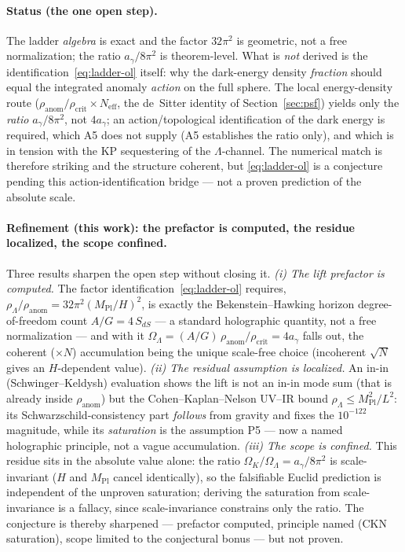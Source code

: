 \documentclass[11pt,a4paper]{article}
\theoremstyle{plain}
\theoremstyle{definition}
\theoremstyle{remark}
\newcommand{\Ok}{\Omega_K}
\newcommand{\OL}{\Omega_\Lambda}
\newcommand{\ag}{a_\gamma}
\newcommand{\Mpl}{M_{\mathrm{Pl}}}
\begin{document}
\paragraph{Status (the one open step).} The ladder \emph{algebra} is exact and the factor
$32\pi^2$ is geometric, not a free normalization; the ratio $\ag/8\pi^2$ is theorem-level. What
is \emph{not} derived is the identification~\eqref{eq:ladder-ol} itself: why the dark-energy
density \emph{fraction} should equal the integrated anomaly \emph{action} on the full sphere. The
local energy-density route ($\rho_{\mathrm{anom}}/\rho_{\mathrm{crit}}\times N_{\mathrm{eff}}$, the
de~Sitter identity of Section~\ref{sec:psf}) yields only the \emph{ratio} $\ag/8\pi^2$, not
$4\ag$; an action/topological identification of the dark energy is required, which A5 does not
supply (A5 establishes the ratio only), and which is in tension with the KP sequestering of the
$\Lambda$-channel. The numerical match is therefore striking and the structure coherent, but
\eqref{eq:ladder-ol} is a conjecture pending this action-identification bridge --- not a proven
prediction of the absolute scale.

\paragraph{Refinement (this work): the prefactor is computed, the residue localized, the scope confined.}
Three results sharpen the open step without closing it. \emph{(i) The lift prefactor is computed.}
The factor identification~\eqref{eq:ladder-ol} requires, $\rho_\Lambda/\rho_{\mathrm{anom}} =
32\pi^2(\Mpl/H)^2$, is exactly the Bekenstein--Hawking horizon degree-of-freedom count $A/G = 4\,S_{dS}$
--- a standard holographic quantity, not a free normalization --- and with it $\OL =
(A/G)\,\rho_{\mathrm{anom}}/\rho_{\mathrm{crit}} = 4\ag$ falls out, the coherent ($\times N$)
accumulation being the unique scale-free choice (incoherent $\sqrt N$ gives an $H$-dependent value). \emph{(ii) The residual assumption is localized.}
An in-in (Schwinger--Keldysh) evaluation shows the lift is not an in-in mode sum (that is already
inside $\rho_{\mathrm{anom}}$) but the Cohen--Kaplan--Nelson UV--IR bound $\rho_\Lambda\le\Mpl^2/L^2$:
its Schwarzschild-consistency part \emph{follows} from gravity and fixes the $10^{-122}$ magnitude,
while its \emph{saturation} is the assumption P5 --- now a named holographic principle, not a vague
accumulation. \emph{(iii) The scope is confined.}
This residue sits in the absolute value alone: the ratio $\Ok/\OL = \ag/8\pi^2$ is scale-invariant
($H$ and $\Mpl$ cancel identically), so the falsifiable Euclid prediction is independent of the
unproven saturation; deriving the saturation from scale-invariance is a fallacy, since scale-invariance
constrains only the ratio. The conjecture is thereby
sharpened --- prefactor computed, principle named (CKN saturation), scope limited to the conjectural
bonus --- but not proven.
\end{document}
